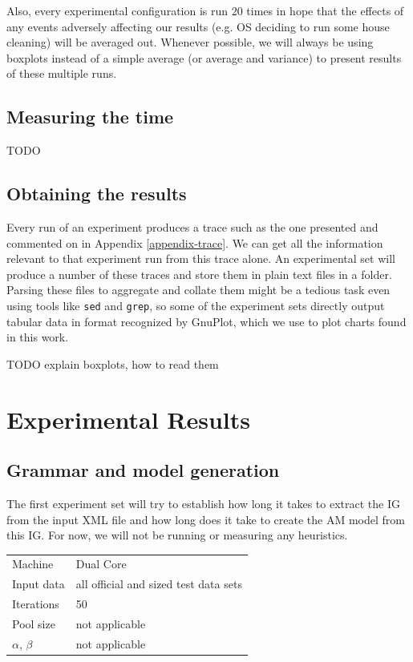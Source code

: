 Also, every experimental configuration is run 20 times in hope that the effects of any events adversely affecting our results (e.g. OS deciding to run some house cleaning) will be averaged out. Whenever possible, we will always be using boxplots instead of a simple average (or average and variance) to present results of these multiple runs. %

\subsection{Measuring the time}

TODO

\subsection{Obtaining the results}

Every run of an experiment produces a trace such as the one presented and commented on in Appendix \ref{appendix-trace}. We can get all the information relevant to that experiment run from this trace alone. An experimental set will produce a number of these traces and store them in plain text files in a folder. Parsing these files to aggregate and collate them might be a tedious task even using tools like \texttt{sed} and \texttt{grep}, so some of the experiment sets directly output tabular data in format recognized by GnuPlot, which we use to plot charts found in this work.

TODO explain boxplots, how to read them

\section{Experimental Results}

\subsection{Grammar and model generation}


The first experiment set will try to establish how long it takes to extract the IG %
from the input XML file and how long does it take to create the AM model from this IG. For now, we will not be running or measuring any heuristics.

\begin{center}
\bigskip
\begin{tabular}{| l | l |}
  \hline
  \hline
  Machine           & Dual Core \\
  Input data        & all official and sized test data sets \\
  Iterations        & 50 \\
  Pool size         & not applicable \\
  $\alpha$, $\beta$ & not applicable \\
  \hline
\end{tabular}
\bigskip
\end{center}

